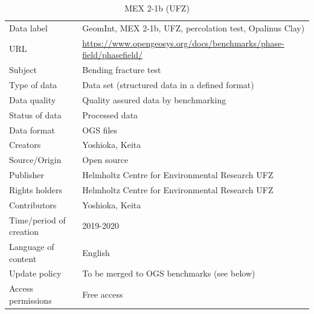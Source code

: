 \begin{table}[!ht]
\caption{MEX 2-1b (UFZ)}
\label{tab:dms-mex2-1a}
\small
\begin{tabular}{R{3.5cm}|L{7.5cm}}
\hline
%
Data label & GeomInt, MEX 2-1b, UFZ, percolation test, Opalinus Clay) \\
URL & \url{https://www.opengeosys.org/docs/benchmarks/phase-field/phasefield/} \\ 
Subject  & Bending fracture test \\
Type of data  & Data set (structured data in a defined format) \\
Data quality  & Quality assured data by benchmarking \\
Status of data  & Processed data \\
Data format  & OGS files \\
Creators  & Yoshioka, Keita  \\
Source/Origin & Open source \\
Publisher  & Helmholtz Centre for Environmental Research UFZ \\
Rights holders & Helmholtz Centre for Environmental Research UFZ \\
Contributors & Yoshioka, Keita \\
Time/period of creation & 2019-2020 \\
Language of content & English \\
Update policy & To be merged to OGS benchmarks (see below) \\
Access permissions & Free access \\
%
\hline
\end{tabular}
\end{table}
